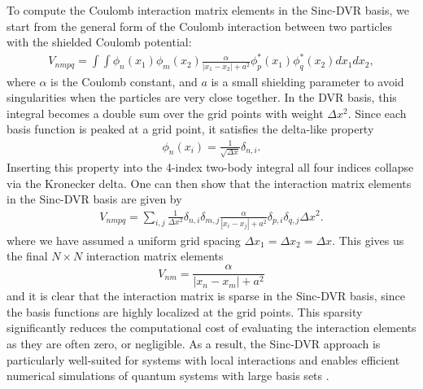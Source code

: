 \documentclass{subfiles}
\begin{document}
To compute the Coulomb interaction matrix elements in the Sinc-DVR basis, we start from the general form of the Coulomb interaction between two particles with the shielded Coulomb potential:
\begin{align*}
    V_{nmpq} = \int \int \phi_n(x_1)\phi_m(x_2){\frac{\alpha}{|x_1 - x_2| + a^2}}\phi_p^*(x_1)\phi_q^*(x_2) dx_1 dx_2,
\end{align*}
where $\alpha$ is the Coulomb constant, and $a$ is a small shielding parameter to avoid singularities when the particles are very close together. In the DVR basis, this integral becomes a double sum over the grid points with weight $\Delta x^2$. Since each basis function is peaked at a grid point, it satisfies the delta-like property
\begin{align*}
    \phi_n(x_i) = \frac{1}{\sqrt{\Delta x}}\delta_{n,i}.
\end{align*}
Inserting this property into the 4-index two-body integral all four indices collapse via the Kronecker delta. One can then show that the interaction matrix elements in the Sinc-DVR basis are given by
\begin{align*}
    V_{nmpq} = \sum_{i,j}\frac{1}{\Delta x^2}\delta_{n,i}\delta_{m,j}\frac{\alpha}{|x_i - x_j| + a^2}\delta_{p,i}\delta_{q,j} \Delta x^2.
\end{align*}
where we have assumed a uniform grid spacing $\Delta x_1 = \Delta x_2 = \Delta x$. This gives us the final $N\times N$ interaction matrix elements
\begin{equation}
    V_{nm} = \frac{\alpha}{|x_n - x_m| + a^2}\label{eq:sinc_dvr_coulomb}
\end{equation}
and it is clear that the interaction matrix is sparse in the Sinc-DVR basis, since the basis functions are highly localized at the grid points. This sparsity significantly reduces the computational cost of evaluating the interaction elements as they are often zero, or negligible. As a result, the Sinc-DVR approach is particularly well-suited for systems with local interactions and enables efficient numerical simulations of quantum systems with large basis sets \cite{light2000discrete}.
\end{document}
